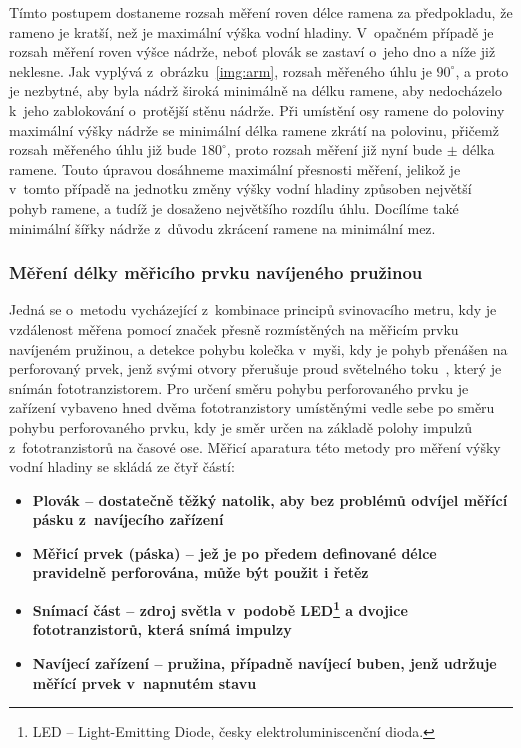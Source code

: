             Tímto postupem dostaneme rozsah měření roven délce ramena za předpokladu, že rameno je kratší, než je maximální výška vodní hladiny. V~opačném případě je rozsah měření roven výšce nádrže, neboť plovák se zastaví o~jeho dno a níže již neklesne.
            Jak vyplývá z~obrázku~\ref{img:arm}, rozsah měřeného úhlu je $90^\circ$, a proto je nezbytné, aby byla nádrž široká minimálně na délku ramene, aby nedocházelo k~jeho zablokování o~protější stěnu nádrže. Při umístění osy ramene do poloviny maximální výšky nádrže se minimální délka ramene zkrátí na polovinu, přičemž rozsah měřeného úhlu již bude $180^\circ$, proto rozsah měření již nyní bude $\pm$ délka ramene. Touto úpravou dosáhneme maximální přesnosti měření, jelikož je v~tomto případě na jednotku změny výšky vodní hladiny způsoben největší pohyb ramene, a tudíž je dosaženo největšího rozdílu úhlu. Docílíme také minimální šířky nádrže z~důvodu zkrácení ramene na minimální mez. 

        \subsubsection{Měření délky měřicího prvku navíjeného pružinou}

            Jedná se o~metodu vycházející z~kombinace principů svinovacího metru, kdy je vzdálenost měřena pomocí značek přesně rozmístěných na měřicím prvku navíjeném pružinou, a detekce pohybu kolečka v~myši, kdy je pohyb přenášen na perforovaný prvek, jenž svými otvory přerušuje proud světelného toku~\cite{mouse}, který je snímán fototranzistorem. Pro určení směru pohybu perforovaného prvku je zařízení vybaveno hned dvěma fototranzistory umístěnými vedle sebe po směru pohybu perforovaného prvku, kdy je směr určen na základě polohy impulzů z~fototranzistorů na časové ose. 
            Měřicí aparatura této metody pro měření výšky vodní hladiny se skládá ze čtyř částí:
            
            \begin{itemize}
                \item \bf Plovák \rm -- dostatečně těžký natolik, aby bez problémů odvíjel měřící pásku z~navíjecího zařízení
                \item \bf Měřicí prvek (páska) \rm -- jež je po předem definované délce pravidelně perforována, může být použit i řetěz
                \item \bf Snímací část \rm -- zdroj světla v~podobě LED\footnote{LED -- Light-Emitting Diode, česky elektroluminiscenční dioda.} a dvojice fototranzistorů, která snímá impulzy
                \item \bf Navíjecí zařízení \rm -- pružina, případně navíjecí buben, jenž udržuje měřící prvek v~napnutém stavu
            \end{itemize}

